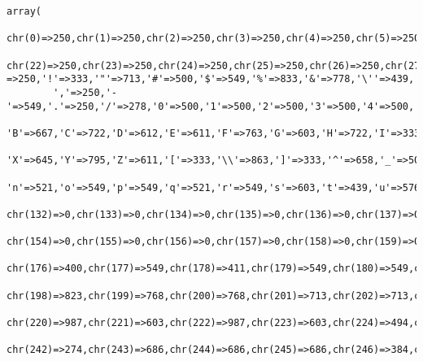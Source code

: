 \footnotesize\begin{verbatim}array(
        chr(0)=>250,chr(1)=>250,chr(2)=>250,chr(3)=>250,chr(4)=>250,chr(5)=>250,chr(6)=>250,chr(7)=>250,chr(8)=>250,chr(9)=>250,chr(10)=>250,chr(11)=>250,chr(12)=>250,chr(13)=>250,chr(14)=>250,chr(15)=>250,chr(16)=>250,chr(17)=>250,chr(18)=>250,chr(19)=>250,chr(20)=>250,chr(21)=>250,
        chr(22)=>250,chr(23)=>250,chr(24)=>250,chr(25)=>250,chr(26)=>250,chr(27)=>250,chr(28)=>250,chr(29)=>250,chr(30)=>250,chr(31)=>250, =>250,'!'=>333,'"'=>713,'#'=>500,'$'=>549,'%'=>833,'&'=>778,'\''=>439,'('=>333,')'=>333,'*'=>500,'+'=>549,
        ','=>250,'-'=>549,'.'=>250,'/'=>278,'0'=>500,'1'=>500,'2'=>500,'3'=>500,'4'=>500,'5'=>500,'6'=>500,'7'=>500,'8'=>500,'9'=>500,':'=>278,';'=>278,'<'=>549,'='=>549,'>'=>549,'?'=>444,'@'=>549,'A'=>722,
        'B'=>667,'C'=>722,'D'=>612,'E'=>611,'F'=>763,'G'=>603,'H'=>722,'I'=>333,'J'=>631,'K'=>722,'L'=>686,'M'=>889,'N'=>722,'O'=>722,'P'=>768,'Q'=>741,'R'=>556,'S'=>592,'T'=>611,'U'=>690,'V'=>439,'W'=>768,
        'X'=>645,'Y'=>795,'Z'=>611,'['=>333,'\\'=>863,']'=>333,'^'=>658,'_'=>500,'`'=>500,'a'=>631,'b'=>549,'c'=>549,'d'=>494,'e'=>439,'f'=>521,'g'=>411,'h'=>603,'i'=>329,'j'=>603,'k'=>549,'l'=>549,'m'=>576,
        'n'=>521,'o'=>549,'p'=>549,'q'=>521,'r'=>549,'s'=>603,'t'=>439,'u'=>576,'v'=>713,'w'=>686,'x'=>493,'y'=>686,'z'=>494,'{'=>480,'|'=>200,'}'=>480,'~'=>549,chr(127)=>0,chr(128)=>0,chr(129)=>0,chr(130)=>0,chr(131)=>0,
        chr(132)=>0,chr(133)=>0,chr(134)=>0,chr(135)=>0,chr(136)=>0,chr(137)=>0,chr(138)=>0,chr(139)=>0,chr(140)=>0,chr(141)=>0,chr(142)=>0,chr(143)=>0,chr(144)=>0,chr(145)=>0,chr(146)=>0,chr(147)=>0,chr(148)=>0,chr(149)=>0,chr(150)=>0,chr(151)=>0,chr(152)=>0,chr(153)=>0,
        chr(154)=>0,chr(155)=>0,chr(156)=>0,chr(157)=>0,chr(158)=>0,chr(159)=>0,chr(160)=>750,chr(161)=>620,chr(162)=>247,chr(163)=>549,chr(164)=>167,chr(165)=>713,chr(166)=>500,chr(167)=>753,chr(168)=>753,chr(169)=>753,chr(170)=>753,chr(171)=>1042,chr(172)=>987,chr(173)=>603,chr(174)=>987,chr(175)=>603,
        chr(176)=>400,chr(177)=>549,chr(178)=>411,chr(179)=>549,chr(180)=>549,chr(181)=>713,chr(182)=>494,chr(183)=>460,chr(184)=>549,chr(185)=>549,chr(186)=>549,chr(187)=>549,chr(188)=>1000,chr(189)=>603,chr(190)=>1000,chr(191)=>658,chr(192)=>823,chr(193)=>686,chr(194)=>795,chr(195)=>987,chr(196)=>768,chr(197)=>768,
        chr(198)=>823,chr(199)=>768,chr(200)=>768,chr(201)=>713,chr(202)=>713,chr(203)=>713,chr(204)=>713,chr(205)=>713,chr(206)=>713,chr(207)=>713,chr(208)=>768,chr(209)=>713,chr(210)=>790,chr(211)=>790,chr(212)=>890,chr(213)=>823,chr(214)=>549,chr(215)=>250,chr(216)=>713,chr(217)=>603,chr(218)=>603,chr(219)=>1042,
        chr(220)=>987,chr(221)=>603,chr(222)=>987,chr(223)=>603,chr(224)=>494,chr(225)=>329,chr(226)=>790,chr(227)=>790,chr(228)=>786,chr(229)=>713,chr(230)=>384,chr(231)=>384,chr(232)=>384,chr(233)=>384,chr(234)=>384,chr(235)=>384,chr(236)=>494,chr(237)=>494,chr(238)=>494,chr(239)=>494,chr(240)=>0,chr(241)=>329,
        chr(242)=>274,chr(243)=>686,chr(244)=>686,chr(245)=>686,chr(246)=>384,chr(247)=>384,chr(248)=>384,chr(249)=>384,chr(250)=>384,chr(251)=>384,chr(252)=>494,chr(253)=>494,chr(254)=>494,chr(255)=>0)
\end{verbatim}\normalsize 
